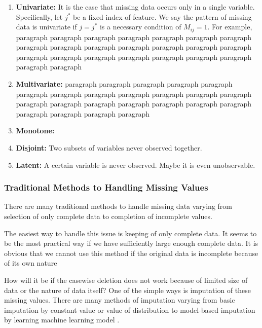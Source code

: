 \begin{enumerate}
	\item \textbf{Univariate:} It is the case that missing data occurs only in a single variable.
	Specifically, let $j^*$ be a fixed index of feature. 
	We say the pattern of missing data is univariate if $j = j^*$ is a necessary condition of $M_{ij} = 1$.
	For example, 
	paragraph paragraph paragraph paragraph paragraph paragraph paragraph paragraph paragraph paragraph paragraph paragraph paragraph paragraph paragraph paragraph paragraph paragraph paragraph paragraph paragraph paragraph paragraph
	
	\item \textbf{Multivariate:} paragraph paragraph paragraph paragraph paragraph paragraph paragraph paragraph paragraph paragraph paragraph paragraph paragraph paragraph paragraph paragraph paragraph paragraph paragraph paragraph paragraph paragraph paragraph
	
	\item \textbf{Monotone:} 
		
	\item \textbf{Disjoint:} Two subsets of variables never observed together.
		
	\item \textbf{Latent:} A certain variable is never observed. Maybe it is even unobservable.
\end{enumerate}

\subsubsection{Traditional Methods to Handling Missing Values}
There are many traditional methods to handle missing data varying from selection of only complete data to completion of incomplete values.

The easiest way to handle this issue is keeping of only complete data.
It seems to be the most practical way if we have sufficiently large enough complete data.
It is obvious that we cannot use this method if the original data is incomplete because of its own nature 

How will it be if the casewise deletion does not work because of limited size of data or the nature of data itself? 
One of the simple ways is imputation of these missing values.
There are many methods of imputation varying from basic imputation by constant value or value of distribution \cite{...} to model-based imputation by learning machine learning model \cite{...}.

